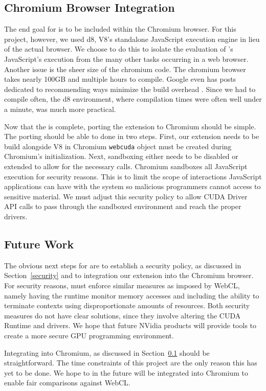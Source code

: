 \subsection{Chromium Browser Integration} 
\label{chromeIntegration}
The end goal for \name is to be included within the
Chromium browser. For this project, however, we used d8, V8's standalone
JavaScript execution engine in lieu of the actual browser. We choose to do this
to isolate the evaluation of \namens's JavaScript's execution from the many other
tasks occurring in a web browser.  Another issue is the sheer size of the chromium code.
The chromium browser takes nearly 100GB and multiple hours to compile. Google
even has 
posts dedicated to recommending ways minimize the build overhead
\cite{linuxfasterbuilds}.  Since we had to compile often, the d8 environment,
where compilation times were often well under a minute, was much more practical.

Now that the \name is complete, porting the extension to Chromium should be
simple. The porting should be able to done in two steps. First, our extension
needs to be build alongside V8 in Chromium \texttt{webcuda} object must be
created during Chromium's initialization.  Next, sandboxing either needs to be
disabled or extended to allow for the necessary \name calls. Chromium sandboxes
all JavaScript execution for security reasons. This is to limit the scope of
interactions JavaScript applications can have with the system so malicious
programmers cannot access to sensitive material. We must adjust this security
policy to allow CUDA Driver API calls to pass through the sandboxed
environment and reach the proper drivers. 


\subsection{Future Work}
\label{future}
The obvious next steps for \name are to establish a security policy, as
discussed in Section~\ref{security} and to integration our extension into the
Chromium browser. For security reasons, \name must enforce similar measures as
imposed by WebCL, namely having the runtime monitor memory accesses and
including the ability to terminate contexts using disproportionate amounts of
resources. Both security measures do not have clear solutions, since they involve
altering the CUDA Runtime and drivers. We hope that future NVidia products will
provide tools to create a more secure GPU programming environment.

Integrating \name into Chromium, as discussed in Section~\ref{chromeIntegration} should be
straightforward. The time constraints of this project are the only reason this
has yet to be done. We hope to in the future \name will be integrated into
Chromium to enable fair comparisons against WebCL.


